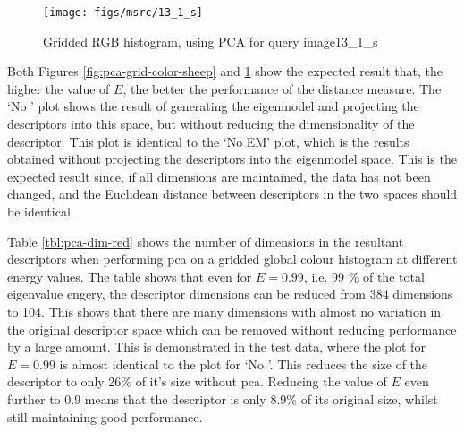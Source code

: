 \begin{appendices}
\begin{figure}[ht]
	\begin{minipage}[]{0.3\linewidth}
		\centering
		\texttt{[image: figs/msrc/13\_1\_s]}
	\end{minipage}
	\begin{minipage}[]{0.7\linewidth}
		\centering
	\end{minipage}
	\caption{Gridded RGB histogram, using PCA for query image13\_1\_s}
	\label{fig:pca-grid-color-books}
\end{figure}

Both Figures \ref{fig:pca-grid-color-sheep} and \ref{fig:pca-grid-color-books} show the expected result that, the higher the value of $E$, the better the performance of the distance measure. The `No ' plot shows the result of generating the eigenmodel and projecting the descriptors into this space, but without reducing the dimensionality of the descriptor. This plot is identical to the `No EM' plot, which is the results obtained without projecting the descriptors into the eigenmodel space. This is the expected result since, if all dimensions are maintained, the data has not been changed, and the Euclidean distance between descriptors in the two spaces should be identical.

Table \ref{tbl:pca-dim-red} shows the number of dimensions in the resultant descriptors when performing \gls{pca} on a gridded global colour histogram at different energy values. The table shows that even for $E=0.99$, i.e. 99 \% of the total eigenvalue engery, the descriptor dimensions can be reduced from 384 dimensions to 104. This shows that there are many dimensions with almost no variation in the original descriptor space which can be removed without reducing performance by a large amount. This is demonstrated in the test data, where the plot for $E=0.99$ is almost identical to the plot for `No '. This reduces the size of the descriptor to only 26\% of it's size without \gls{pca}. Reducing the value of $E$ even further to $0.9$ means that the descriptor is only 8.9\% of its original size, whilst still maintaining good performance.


\end{appendices}
